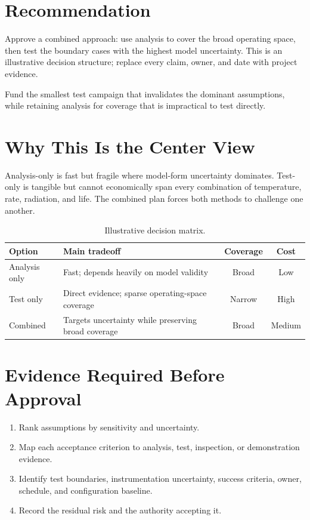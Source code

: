 \documentclass{linearspace-memo}
\begin{document}
\LSMakeMemoHeader

\section{Recommendation}

Approve a combined approach: use analysis to cover the broad operating space,
then test the boundary cases with the highest model uncertainty. This is an
illustrative decision structure; replace every claim, owner, and date with
project evidence.

\begin{LSKeyPoint}
Fund the smallest test campaign that invalidates the dominant assumptions,
while retaining analysis for coverage that is impractical to test directly.
\end{LSKeyPoint}

\section{Why This Is the Center View}

Analysis-only is fast but fragile where model-form uncertainty dominates.
Test-only is tangible but cannot economically span every combination of
temperature, rate, radiation, and life. The combined plan forces both methods
to challenge one another.

\begin{table}[htbp]
  \centering
  \caption{Illustrative decision matrix.}
  \begin{tabularx}{\linewidth}{@{}p{1.30in}X c c@{}}
    \toprule
    \textbf{Option} & \textbf{Main tradeoff} & \textbf{Coverage} & \textbf{Cost} \\
    \midrule
    Analysis only & Fast; depends heavily on model validity & Broad & Low \\
    Test only & Direct evidence; sparse operating-space coverage & Narrow & High \\
    Combined & Targets uncertainty while preserving broad coverage & Broad & Medium \\
    \bottomrule
  \end{tabularx}
\end{table}

\section{Evidence Required Before Approval}

\begin{enumerate}
  \item Rank assumptions by sensitivity and uncertainty.
  \item Map each acceptance criterion to analysis, test, inspection, or
  demonstration evidence.
  \item Identify test boundaries, instrumentation uncertainty, success criteria,
  owner, schedule, and configuration baseline.
  \item Record the residual risk and the authority accepting it.
\end{enumerate}
\end{document}
